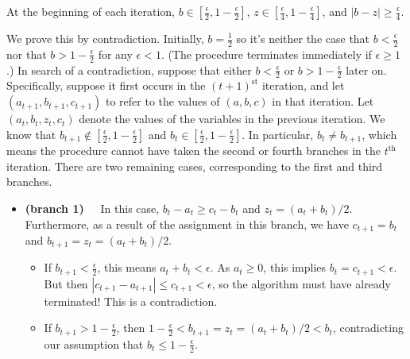 \begin{lproof}
    \begin{iclaim} \label{claim:b-z-eps-sep}
        At the beginning of each iteration,
        $b \in [\frac\epsilon2, 1-\frac\epsilon2]$,
        $z \in [\frac\epsilon4, 1-\frac\epsilon4]$,
       and $|b-z| \ge \frac{\epsilon}{4}$.
    \end{iclaim}
    We prove this by contradiction.
    Initially, $b = \frac12$
    so it's neither the case that $b < \frac\epsilon2$ nor that $b > 1-\frac\epsilon2$
    for any $\epsilon < 1$. (The procedure terminates immediately
        if  $\epsilon \ge 1$.)
    In search of a contradiction,
        suppose that either $b < \frac\epsilon2$ or $b > 1 - \frac\epsilon2$ later on.
    Specifically, suppose it first occurs in the $(t+1)^{\text{st}}$ iteration,
        and let $(a_{t+1},b_{t+1},c_{t+1})$ to refer to the values of
        $(a,b,c)$ in that iteration.
    Let $(a_t, b_t, z_t, c_t)$ denote the values of the variables
        in the previous iteration.
    We know that $b_{t+1} \notin [\frac\epsilon2, 1-\frac\epsilon2]$
        and $b_t \in [\frac\epsilon2, 1-\frac\epsilon2]$.
    In particular, $b_{t} \ne b_{t+1}$, which means the procedure
        cannot have taken the second or fourth branches in the $t^{\text{th}}$ iteration.
    There are two remaining cases, corresponding to the first
        and third branches.
    \begin{itemize}
    \item \textbf{(branch 1)~~} In this case, $b_t-a_t \ge c_t - b_t$ and $z_t = {(a_t+b_t)}/2$.  Furthermore, as a result of the assignment in this branch, we have $c_{t+1} = b_t$ and
            $b_{t+1} =  z_t  = {(a_t+b_t)}/2$.
    \begin{itemize}
        \item
        If $b_{t+1} < \frac\epsilon2$, this means $a_t + b_t < \epsilon$.
        As $a_t \ge 0$, this implies $b_{t} = c_{t+1} < \epsilon$.
        But then $|c_{t+1} - a_{t+1}| \le c_{t+1} < \epsilon$, so the algorithm must
        have already terminated! This is a contradiction.
        \item
        If $b_{t+1} > 1-\frac\epsilon2$, then
        $1- \frac\epsilon2 < b_{t+1} = z_t = (a_t+b_t)/2 < b_t$,
        contradicting our assumption that $b_t \le 1-\frac\epsilon2$.
    \end{itemize}



\end{itemize}
\end{lproof}
